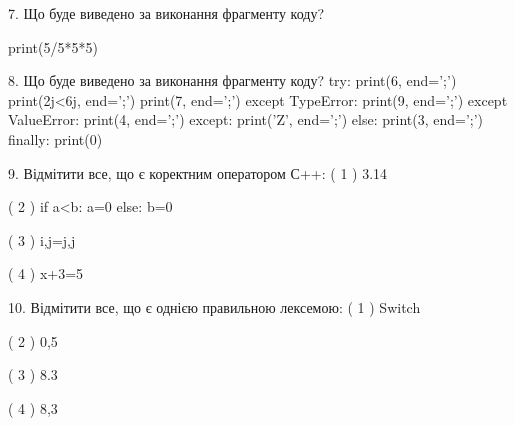\documentclass[11pt]{article}
\begin{document}
7. Що буде виведено за виконання фрагменту коду?

print(5/5*5*5)
\vspace{5mm}

8. Що буде виведено за виконання фрагменту коду?
try:
    print(6, end=';')
    print(2j<6j, end=';')
    print(7, end=';')
except TypeError:
    print(9, end=';')
except ValueError:
    print(4, end=';')
except:
    print('Z', end=';')
else:
    print(3, end=';')
finally:
    print(0)
\vspace{5mm}

9. %
Відмітити все, що є коректним оператором С++:
( 1 ) 3.14%

( 2 ) if a<b: a=0 else: b=0

( 3 ) i,j=j,j

( 4 ) x+3=5
\vspace{5mm}

10. %
Відмітити все, що є однією правильною лексемою:
( 1 ) Switch

( 2 ) 0,5

( 3 ) 8.3

( 4 ) 8,3
\vspace{5mm}

\newpage
\end{document}
